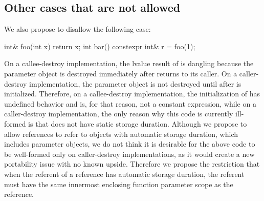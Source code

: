 \documentclass{wg21}
\begin{document}
\subsection{Other cases that are not allowed}
We also propose to disallow the following case:
\begin{colorblock}
int& foo(int x) { return x; }
int bar() {
    constexpr int& r = foo(1);
}
\end{colorblock}
On a callee-destroy implementation, the lvalue result of  is
dangling because the parameter object  is destroyed immediately after
 returns to its caller. On a caller-destroy implementation, the
parameter object  is not destroyed until after  is
initialized. Therefore, on a callee-destroy implementation, the initialization
of  has undefined behavior and is, for that reason, not a constant
expression, while on a caller-destroy implementation, the only reason why this
code is currently ill-formed is that  does not have static
storage duration. Although we propose to allow  references to
refer to objects with automatic storage duration, which includes parameter
objects, we do not think it is desirable for the above code to be well-formed
only on caller-destroy implementations, as it would create a new portability
issue with no known upside. Therefore we propose the restriction that when the
referent of a  reference has automatic storage duration, the
referent must have the same innermost enclosing function parameter scope as the
reference.
\end{document}
